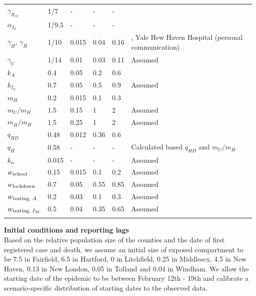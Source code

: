 \documentclass[11pt]{article}
\begin{document}
\begin{table}[!htb]
\begin{tabular}{p{} p{} p{} p{} p{} p{} }
		$\gamma_{R_M}$ & 1/7 & {-} & {-} & {-} & \citep{wolfel2020virological, cdc2020isolation} \\[0.5em]
		$\alpha_{I_S}$ & 1/9.5 & {-} & {-} & {-} & \citep{verity2020estimates, lewnard2020incidence, garg2020hospitalization, perez2020clinical} \\[0.5em]
		$\gamma_H$, $\gamma_{\bar{H}}$ & 1/10 & 0.015 & 0.04 & 0.16 & \citep{lane2020country, lewnard2020incidence, paranjpe2020clinical, gold2020characteristics}, Yale Hew Haven Hospital (personal communication) \\[0.5em]
		$\gamma_U$ & 1/14 & 0.01 & 0.03 & 0.11 & Assumed \\[0.5em]
		$k_A$ & 0.4 & 0.05 & 0.2 & 0.6 & \citep{salomon2020defining, ferguson2020impact} \\[0.5em]
		$k_{I_S}$ &  0.7 & 0.05 & 0.5 & 0.9 & Assumed \\[0.5em]
		$m_H$ & 0.2 & 0.015 & 0.1 & 0.3 & \citep{lane2020country, lewnard2020incidence, paranjpe2020clinical, petrilli2020factors, verity2020estimates, perez2020clinical, docherty2020features, CHAwebsite} \\[0.5em]
		$m_U / m_H$ & 1.5 & 0.15 & 1 & 2 & Assumed \\[0.5em]
		$m_{\bar{H}} / m_H$ & 1.5 & 0.25 & 1 & 2 & Assumed \\[0.5em]
		$q_{HD}$ & 0.48 & 0.012 & 0.36 & 0.6 & \citep{CHAwebsite, DPHwebsite} \\[0.5em]		
		$q_H$ & 0.58 & {-} & {-} & {-} & {Calculated based $q_{HD}$ and $m_U/m_H$} \\[0.5em]
		$k_n$ & 0.015 & {-} & {-} & {-} & Assumed \\[0.5em]
		$w\textsubscript{school}$ & 0.15 & 0.015 & 0.1 & 0.2 & Assumed \\[0.5em]
		$w\textsubscript{lockdown}$ & 0.7 & 0.05 & 0.55 & 0.85 & Assumed \\[0.5em]
		$w\textsubscript{testing, $A$}$ & 0.2 & 0.03 & 0.1 & 0.3 & Assumed \\[0.5em]
		$w\textsubscript{testing, $I_M$}$ & 0.5 & 0.04 & 0.35 & 0.65 & Assumed \\[0.5em]
		\bottomrule
	\label{table:priors}
	\end{tabular}
	\end{table}
\endgroup



\textbf{Initial conditions and reporting lags}\\[0.5em]
Based on the relative population size of the counties and the date of first registered case and death, we assume an initial size of exposed compartment to be 7.5 in Fairfield, 6.5 in Hartford, 0 in Litchfield, 0.25 in Middlesex, 4.5 in New Haven, 0.13 in New London, 0.05 in Tolland and 0.04 in Windham. We allow the starting date of the epidemic to be between February 12th - 19th and calibrate a scenario-specific distribution of starting dates to the observed data. 
\end{document}
